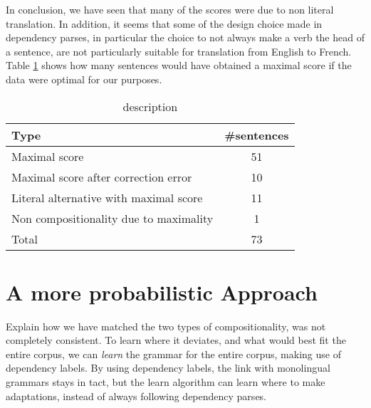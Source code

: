 In conclusion, we have seen that many of the scores were due to non literal translation. In addition, it seems that some of the design choice made in dependency parses, in particular the choice to not always make a verb the head of a sentence, are not particularly suitable for translation from English to French. Table \ref{tab:optimal_score2} shows how many sentences would have obtained a maximal score if the data were optimal for our purposes.

\begin{table}[!ht]
\centering
\begin{tabular}{|l|c|}
\hline
\textbf{Type} & \textbf{\#sentences}\\
\hline
\hline
Maximal score & 51\\
\hline
Maximal score after correction error & 10 \\
\hline
Literal alternative with maximal score & 11 \\
\hline
Non compositionality due to maximality & 1 \\
\hline
Total & 73\\
\hline
\end{tabular}
\caption{description}\label{tab:optimal_score2}
\end{table}







\section{A more probabilistic Approach}
\label{sec:stat}

Explain how we have matched the two types of compositionality, was not completely consistent. To learn where it deviates, and what would best fit the entire corpus, we can \textit{learn} the grammar for the entire corpus, making use of dependency labels. By using dependency labels, the link with monolingual grammars stays in tact, but the learn algorithm can learn where to make adaptations, instead of always following dependency parses.


\section{}








%
%